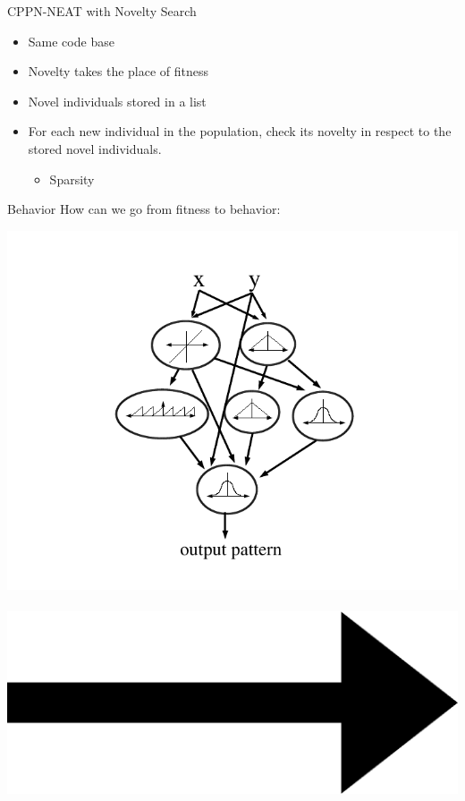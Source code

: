 \documentclass{beamer}
\begin{document}
\begin{frame}{CPPN-NEAT with Novelty Search~\cite{lehman2011abandoning}}
\begin{itemize}
\item Same code base
\item Novelty takes the place of fitness
\item Novel individuals stored in a list
\item For each new individual in the population, check its novelty in respect to the stored novel individuals.
\begin{itemize}
\item Sparsity
\end{itemize}
\end{itemize}
\end{frame}

\begin{frame}{Behavior}
How can we go from fitness to behavior:\\
\vspace{0.2cm}
\begin{center}
\includegraphics[height=0.15\textheight]{../Figures/Misc/cppnNetwork.png}\	
\includegraphics[height=0.05\textheight]{../Figures/Misc/Arrow_east.eps}\	

\end{center}
\end{frame}
\end{document}
